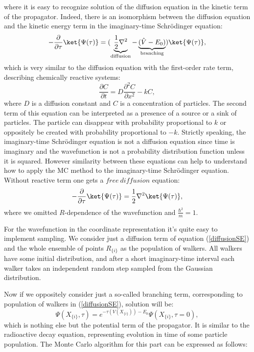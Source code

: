 \documentclass[twoside,english]{uiofysmaster}
\begin{document}
where it is easy to recognize solution of the diffusion equation in the kinetic term of the propagator. Indeed, there is an isomorphism between the diffusion equation and the kinetic energy term in the imaginary-time Schr\"{o}dinger equation:
\begin{equation}\label{diffusionSE}
-\frac{\partial}{\partial \tau} \ket{\Psi(\tau)}= (\underbrace{\frac{1}{2}\nabla^2}_{\text{diffusion}} - \underbrace{(\hat{V} -E_0)}_{\text{branching}}) \ket{\Psi(\tau)},
\end{equation}
which is very similar to the diffusion equation with the first-order rate term, describing chemically reactive systems:
\begin{equation}\label{classdiffeq}
\frac{\partial C}{\partial t} = D\frac{\partial^2 C}{\partial x^2} - kC,
\end{equation}
where $D$ is a diffusion constant and $C$ is a concentration of particles. The second term of this equation can be interpreted as a presence of a source or a sink of particles. The particle can disappear with probability proportional to $k$ or oppositely be created with probability proportional to $-k$.
Strictly speaking, the imaginary-time Schr\"{o}dinger equation is not a diffusion equation since time is imaginary and the wavefunction is not a probability distribution function unless it is squared. However similarity between these equations can help to understand how to apply the MC method to the imaginary-time Schr\"{o}dinger equation.
Without reactive term one gets a $free\ diffusion$ equation:
\begin{equation}
-\frac{\partial}{\partial \tau} \ket{\Psi(\tau)}= \frac{1}{2}\nabla^2 \ket{\Psi(\tau)},
\end{equation}
where we omitted $R$-dependence of the wavefunction and $\frac{\hbar^2}{m} = 1$. 

For the wavefunction in the coordinate representation it's quite easy to implement sampling. We consider just a diffusion term of equation (\ref{diffusionSE}) and the whole ensemble of points $R_{\{i\}}$ as the population of walkers. All walkers have some initial distribution, and after a short imaginary-time interval each walker takes an independent random step sampled from the Gaussian distribution.

Now if we oppositely consider just a so-called branching term, corresponding to population of walkers in (\ref{diffusionSE}), solution will be:
\begin{equation}\label{branchingsol}
\Psi(X_{\{i\}}, \tau) = e^{-\tau(V(X_{\{i\}})) - E_0}\Psi(X_{\{i\}}, \tau=0),
\end{equation}
which is nothing else but the potential term of the propagator. It is similar to the radioactive decay equation, representing evolution in time of some particle population. The Monte Carlo algorithm for this part can be expressed as  follows: 
\end{document}
